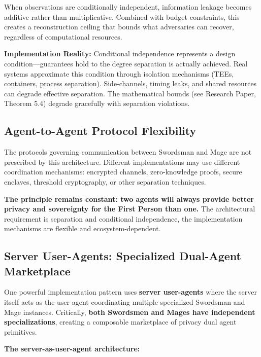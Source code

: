 \documentclass[
]{article}
\begin{document}
When observations are conditionally independent, information leakage
becomes additive rather than multiplicative. Combined with budget
constraints, this creates a reconstruction ceiling that bounds what
adversaries can recover, regardless of computational resources.

\textbf{Implementation Reality:} Conditional independence represents a
design condition---guarantees hold to the degree separation is actually
achieved. Real systems approximate this condition through isolation
mechanisms (TEEs, containers, process separation). Side-channels, timing
leaks, and shared resources can degrade effective separation. The
mathematical bounds (see Research Paper, Theorem 5.4) degrade gracefully
with separation violations.

\subsection{Agent-to-Agent Protocol
Flexibility}\label{agent-to-agent-protocol-flexibility}

The protocols governing communication between Swordsman and Mage are not
prescribed by this architecture. Different implementations may use
different coordination mechanisms: encrypted channels, zero-knowledge
proofs, secure enclaves, threshold cryptography, or other separation
techniques.

\textbf{The principle remains constant: two agents will always provide
better privacy and sovereignty for the First Person than one.} The
architectural requirement is separation and conditional independence,
the implementation mechanisms are flexible and ecosystem-dependent.

\subsection{Server User-Agents: Specialized Dual-Agent
Marketplace}\label{server-user-agents-specialized-dual-agent-marketplace}

One powerful implementation pattern uses \textbf{server user-agents}
where the server itself acts as the user-agent coordinating multiple
specialized Swordsman and Mage instances. Critically, \textbf{both
Swordsmen and Mages have independent specializations}, creating a
composable marketplace of privacy dual agent primitives.

\textbf{The server-as-user-agent architecture:}
\end{document}
